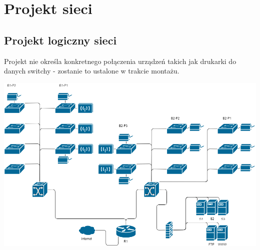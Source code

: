 \documentclass{article}
\begin{document}
\newpage
\section{Projekt sieci}

\subsection{Projekt logiczny sieci}
\par Projekt nie określa konkretnego połączenia urządzeń takich jak drukarki do danych switchy - zostanie to ustalone w trakcie montażu.
\begin{center}
	\includegraphics[scale=0.55, center]{ts2_diagram}
\end{center}
\newpage
\end{document}
